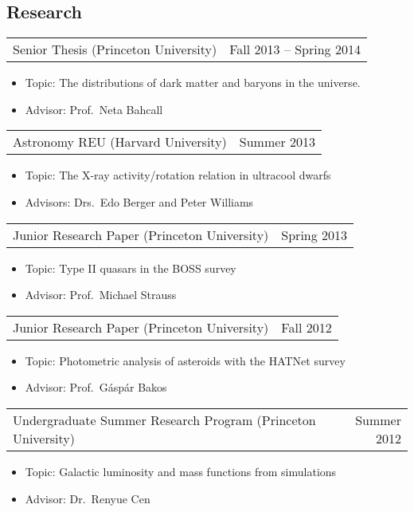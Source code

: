 \documentclass[margin]{res}
\begin{document}
\begin{resume}
\normalsize{\section{Research}}
\begin{tabular}{@{}p{4in} r}
  Senior Thesis (Princeton University) & Fall 2013 -- Spring 2014
\end{tabular}
\begin{itemize} \itemsep -2pt
\item[] Topic: The distributions of dark matter and baryons in the
  universe.
\item[] Advisor: Prof.~Neta Bahcall
\end{itemize}
\begin{tabular}{@{}p{4in} r}
  Astronomy REU (Harvard University) & Summer 2013
\end{tabular}
\begin{itemize} \itemsep -2pt
\item[] Topic: The X-ray activity/rotation relation in ultracool
  dwarfs
\item[] Advisors: Drs.~Edo Berger and Peter Williams
\end{itemize}
\begin{tabular}{@{}p{4in} r}
  Junior Research Paper (Princeton University) & Spring 2013
\end{tabular}
\begin{itemize} \itemsep -2pt
\item[] Topic: Type II quasars in the BOSS survey
\item[] Advisor: Prof.~Michael Strauss
\end{itemize}
\begin{tabular}{@{}p{4in} r}
  Junior Research Paper (Princeton University) & Fall 2012
\end{tabular}
\begin{itemize} \itemsep -2pt
\item[] Topic: Photometric analysis of asteroids with the HATNet
  survey
\item[] Advisor: Prof.~G\'asp\'ar Bakos
\end{itemize}
\begin{tabular}{@{}p{4in} r}
  Undergraduate Summer Research Program (Princeton University) &
  Summer 2012
\end{tabular}
\begin{itemize} \itemsep -2pt
\item[] Topic: Galactic luminosity and mass functions from simulations
\item[] Advisor: Dr.~Renyue Cen
\end{itemize}


\end{resume}
\end{document}
